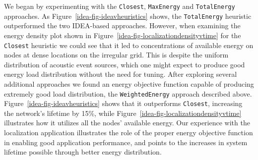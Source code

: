 We began by experimenting with the \texttt{Closest}, \texttt{MaxEnergy} and
\texttt{TotalEnergy} approaches. As Figure~\ref{idea-fig-ideavheuristics}
shows, the \texttt{TotalEnergy} heuristic outperformed the two IDEA-based
approaches. However, when examining the energy density plot shown in
Figure~\ref{idea-fig-localizationdensityvtime} for the \texttt{Closest}
heuristic we could see that it led to concentrations of available energy on
nodes at dense locations on the irregular grid. This is despite the uniform
distribution of acoustic event sources, which one might expect to produce
good energy load distribution without the need for tuning. After exploring
several additional approaches we found an energy objective function capable
of producing extremely good load distribution, the \texttt{WeightedEnergy}
approach described above. Figure~\ref{idea-fig-ideavheuristics} shows that it
outperforms \texttt{Closest}, increasing the network's lifetime by 15\%,
while Figure~\ref{idea-fig-localizationdensityvtime} illustrates how it
utilizes all the nodes' available energy. Our experience with the
localization application illustrates the role of the proper energy objective
function in enabling good application performance, and points to the
increases in system lifetime possible through better energy distribution. 
